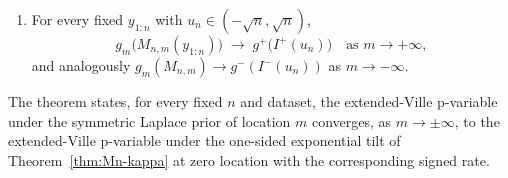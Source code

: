 \documentclass[12pt, a4paper]{report}
\newcommand{\E}{\mathbb{E}}
\newcommand{\1}{\mathbf{1}}
\begin{document}
\begin{theorem}
\begin{enumerate}
\begin{equation}
  g_m(c) \;:=\; \E_0\!\left[\min\!\Bigl(\tfrac{M_{2,m}(U_2)}{c},\,1\Bigr)\right],
  \quad
  g^\pm(c) \;:=\; \E_0\!\left[\min\!\Bigl(\tfrac{I^\pm(U_2)}{c},\,1\Bigr)\right],
  \quad c>0.
\end{equation}
    \item[(c)] For every fixed $y_{1:n}$ with
$u_n\in(-\sqrt n,\sqrt n)$,
\begin{equation}\label{eq:p-conv-Lap}
  g_m\!\bigl(M_{n,m}(y_{1:n})\bigr)
  \;\longrightarrow\; g^+\!\bigl(I^+(u_n)\bigr)
  \quad\text{as }m\to+\infty,
\end{equation}
and analogously $g_m(M_{n,m})\to g^-(I^-(u_n))$ as $m\to-\infty$.
\end{enumerate}
\end{theorem}
The theorem states, for every fixed $n$ and dataset, the extended-Ville p-variable under the symmetric Laplace prior of location $m$ converges, as
$m\to\pm\infty$, to the extended-Ville p-variable under the one-sided exponential tilt of Theorem~\ref{thm:Mn-kappa} at zero location with
the corresponding signed rate.
\end{document}

